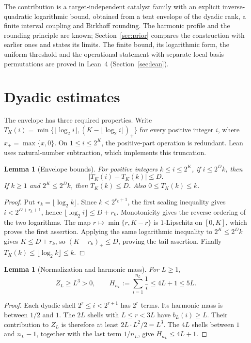 \documentclass[11pt]{article}
\newtheorem{lemma}[theorem]{Lemma}
\begin{document}
The contribution is a target-independent catalyst family with an explicit inverse-quadratic logarithmic bound, obtained from a tent envelope of the dyadic rank, a finite interval coupling and Birkhoff rounding. The harmonic profile and the rounding principle are known; Section~\ref{sec:prior} compares the construction with earlier ones and states its limits. The finite bound, its logarithmic form, the uniform threshold and the operational statement with separate local basis permutations are proved in Lean~4 (Section~\ref{sec:lean}).

\section{Dyadic estimates}

The envelope has three required properties. Write $T_K(i)=\min\{\lfloor\log_2 i\rfloor,(K-\lfloor\log_2 i\rfloor)_+\}$ for every positive integer $i$, where $x_+=\max\{x,0\}$. On $1\leq i\leq2^K$, the positive-part operation is redundant. Lean uses natural-number subtraction, which implements this truncation.

\begin{lemma}[Envelope bounds]\label{lem:tent}
For positive integers $k\leq i\leq2^K$, if $i\leq2^Dk$, then
\[
 |T_K(i)-T_K(k)|\leq D.
\]
If $k\geq1$ and $2^K\leq2^Dk$, then $T_K(k)\leq D$. Also $0\leq T_K(k)\leq k$.
\end{lemma}
\begin{proof}
Put $r_k=\lfloor\log_2 k\rfloor$. Since $k<2^{r_k+1}$, the first scaling inequality gives $i<2^{D+r_k+1}$, hence $\lfloor\log_2 i\rfloor\leq D+r_k$. Monotonicity gives the reverse ordering of the two logarithms. The map $r\mapsto\min\{r,K-r\}$ is $1$-Lipschitz on $[0,K]$, which proves the first assertion. Applying the same logarithmic inequality to $2^K\leq2^Dk$ gives $K\leq D+r_k$, so $(K-r_k)_+\leq D$, proving the tail assertion. Finally $T_K(k)\leq\lfloor\log_2 k\rfloor\leq k$.
\end{proof}

\begin{lemma}[Normalization and harmonic mass]\label{lem:norm}
For $L\geq1$,
\[
 Z_L\geq L^3>0,
 \qquad H_{n_L}:=\sum_{i=1}^{n_L}\frac1i\leq4L+1\leq5L.
\]
\end{lemma}
\begin{proof}
Each dyadic shell $2^r\leq i<2^{r+1}$ has $2^r$ terms. Its harmonic mass is between $1/2$ and $1$. The $2L$ shells with $L\leq r<3L$ have $b_L(i)\geq L$. Their contribution to $Z_L$ is therefore at least $2L\cdot L^2/2=L^3$. The $4L$ shells between $1$ and $n_L-1$, together with the last term $1/n_L$, give $H_{n_L}\leq4L+1$.
\end{proof}
\end{document}
